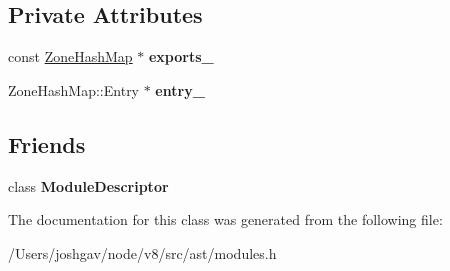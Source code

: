 \subsection*{Private Attributes}
\begin{DoxyCompactItemize}
\item 
const \hyperlink{classv8_1_1internal_1_1_template_hash_map_impl}{Zone\+Hash\+Map} $\ast$ {\bfseries exports\+\_\+}\hypertarget{classv8_1_1internal_1_1_module_descriptor_1_1_iterator_ae1fbe7fedc5cbb3fceda4cfe77b24bda}{}\label{classv8_1_1internal_1_1_module_descriptor_1_1_iterator_ae1fbe7fedc5cbb3fceda4cfe77b24bda}

\item 
Zone\+Hash\+Map\+::\+Entry $\ast$ {\bfseries entry\+\_\+}\hypertarget{classv8_1_1internal_1_1_module_descriptor_1_1_iterator_a5015587a8a9f5182a1201a809367c9c8}{}\label{classv8_1_1internal_1_1_module_descriptor_1_1_iterator_a5015587a8a9f5182a1201a809367c9c8}

\end{DoxyCompactItemize}
\subsection*{Friends}
\begin{DoxyCompactItemize}
\item 
class {\bfseries Module\+Descriptor}\hypertarget{classv8_1_1internal_1_1_module_descriptor_1_1_iterator_a5d2418472b9082249e51af2d016872bd}{}\label{classv8_1_1internal_1_1_module_descriptor_1_1_iterator_a5d2418472b9082249e51af2d016872bd}

\end{DoxyCompactItemize}


The documentation for this class was generated from the following file\+:\begin{DoxyCompactItemize}
\item 
/\+Users/joshgav/node/v8/src/ast/modules.\+h\end{DoxyCompactItemize}
